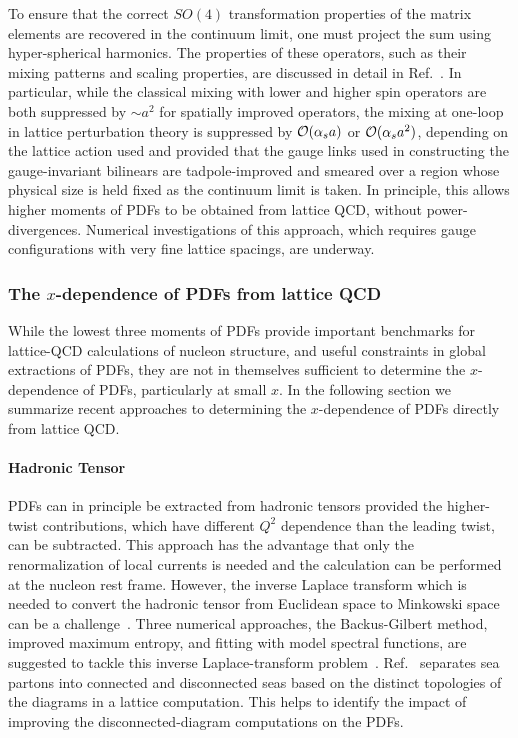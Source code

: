 To ensure that the correct $SO(4)$ transformation properties of the matrix elements are recovered in the continuum limit, one must project the sum using hyper-spherical harmonics.
%
The properties of these operators, such as their mixing patterns and scaling properties, are discussed in detail in
Ref.~\cite{Davoudi:2012ya}.
%
In particular, while the classical mixing with lower and higher spin operators are both suppressed by $\sim a^2$ for spatially improved operators, the mixing at one-loop in lattice perturbation theory is suppressed by ${\cal O}(\alpha_s a)$ or ${\cal O}(\alpha_s a^2)$, depending on the lattice action used and provided that the gauge links used in constructing the gauge-invariant bilinears are tadpole-improved and smeared over a region whose physical size is held fixed as the continuum limit is taken. In principle, this allows higher moments of PDFs to be obtained from lattice QCD, without power-divergences. Numerical investigations of this approach,
which requires gauge configurations with very fine lattice spacings, are underway.

\subsubsection{The $x$-dependence of PDFs from lattice QCD}
\label{sec:xdependence}

While the lowest three moments of PDFs provide important benchmarks for lattice-QCD calculations of nucleon structure, and useful constraints in global extractions of PDFs, they are not in themselves sufficient to determine the $x$-dependence of PDFs, particularly at small $x$.
%
In the following section we summarize recent approaches to determining the $x$-dependence of PDFs directly from lattice QCD.

\paragraph*{Hadronic Tensor} 
PDFs can in principle be extracted from hadronic tensors provided the higher-twist contributions, which have different $Q^2$ dependence than the leading twist, can be subtracted. This approach has the advantage that only the renormalization of local currents  is needed and the calculation can be performed at the nucleon rest frame. However, the inverse Laplace transform which is needed to convert the hadronic tensor from Euclidean space to Minkowski space can be a challenge~\cite{Liu:1993cv,Liu:1999ak}. Three numerical approaches, the Backus-Gilbert method, improved maximum entropy, and fitting with model spectral functions, are suggested to tackle this inverse Laplace-transform problem~\cite{Liu:2016djw}. Ref.~\cite{Liu:1993cv} separates sea partons into connected and disconnected seas based on the distinct topologies of the diagrams in a lattice computation. This helps to identify the impact of improving the disconnected-diagram computations on the PDFs.



